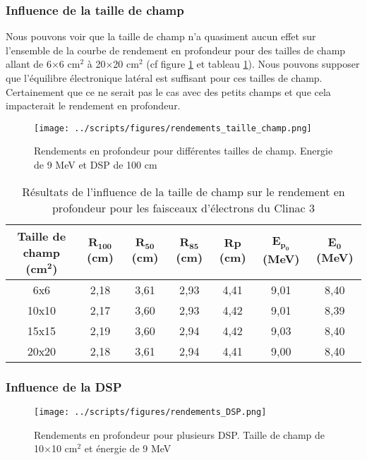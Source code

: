 \documentclass{article}
\begin{document}
\subsubsection{Influence de la taille de champ}

Nous pouvons voir que la taille de champ n'a quasiment aucun effet sur l'ensemble de la courbe de rendement en profondeur pour des tailles de champ allant de 6$\times$6 cm$^2$ à 20$\times$20 cm$^2$ (cf figure \ref*{fig_rdt_champ} et tableau \ref*{table_rdt_champs}). Nous pouvons supposer que l'équilibre électronique latéral est suffisant pour ces tailles de champ. Certainement que ce ne serait pas le cas avec des petits champs et que cela impacterait le rendement en profondeur.

\begin{figure}[h!]
  \centering
  \texttt{[image: ../scripts/figures/rendements\_taille\_champ.png]}
  \caption{Rendements en profondeur pour différentes tailles de champ. Energie de 9 MeV et DSP de 100 cm}
  \label{fig_rdt_champ}
\end{figure}

\begin{table}[h]
  \centering
  \begin{tabular}{ccccccc}
  \toprule
  \textbf{Taille de champ} \textbf{(cm}$\mathbf{^2}$\textbf{)} & $\mathbf{R_{100}}$ \textbf{(cm)} & $\mathbf{R_{50}}$ \textbf{(cm)} & $\mathbf{R_{85}}$ \textbf{(cm)} & $\mathbf{Rp}$\textbf{(cm)} & $\mathbf{E_{p_0}}$ \textbf{(MeV)} & $\mathbf{E_0}$ \textbf{(MeV)} \\ \toprule
  6x6 & 2,18 & 3,61 & 2,93 & 4,41 & 9,01 & 8,40 \\
  10x10 & 2,17 & 3,60 & 2,93 & 4,42 & 9,01 & 8,39 \\
  15x15 & 2,19 & 3,60 & 2,94 & 4,42 & 9,03 & 8,40 \\
  20x20 & 2,18 & 3,61 & 2,94 & 4,41 & 9,00 & 8,40 \\ \bottomrule
  \end{tabular}
  \caption{Résultats de l'influence de la taille de champ sur le rendement en profondeur pour les faisceaux d'électrons du Clinac 3}
  \label{table_rdt_champs}
\end{table}

\subsubsection{Influence de la DSP}

\begin{figure}[h!]
  \centering
  \texttt{[image: ../scripts/figures/rendements\_DSP.png]}
  \caption{Rendements en profondeur pour plusieurs DSP. Taille de champ de 10$\times$10 cm$^2$ et énergie de 9 MeV}
  \label{fig_rdt_DSP}
\end{figure}
\end{document}
